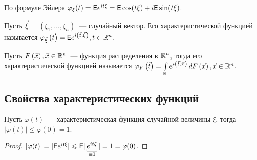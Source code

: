  По формуле Эйлера $\varphi_\xi(t) = \mathsf{E} e^{i t \xi} = \mathsf{E} \cos (t \xi) + i \mathsf{E} \sin(t \xi)$.
 
 \begin{definition}
 	Пусть $\vec \xi = ( \xi_1, \ldots, \xi_n)$~--- случайный вектор. Его характеристической функцией называется $\varphi_{\vec \xi} \left(\vec t \right) = \mathsf{E} e^{i \left( \vec t, \vec \xi \right)}, t \in \mathbb{R}^n$.
 \end{definition}
 \begin{definition}
 	Пусть $F \left( \vec x \right), \vec x \in \mathbb{R}^n$~--- функция распределения в $\mathbb{R}^n$, тогда его характеристической функцией называется $\varphi_F \left( \vec t \right) = \int\limits_{\mathbb{R}} e^{i \left( \vec t, \vec x \right)} \, d F \left( \vec x \right), \vec x \in \mathbb{R}^n$.
 \end{definition}
 \subsection{Свойства характеристических функций}
 \setcounter{property}{0}
 \begin{property}
 	Пусть $\varphi(t)$~--- характеристическая функция случайной величины $\xi$, тогда $| \varphi (t) | \leqslant \varphi(0) = 1$.
 	\begin{proof}
 		$| \varphi(t) | = | \E e^{i t \xi} | \leqslant \E | \underbracket[0.5pt]{e^{i t \xi}}_{\equiv 1} | = 1 = \varphi(0)$.
 	\end{proof}
 \end{property}
 